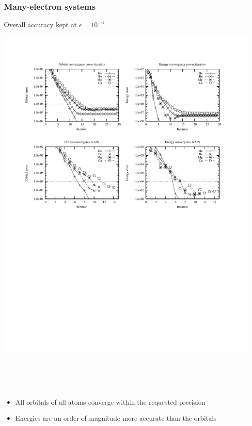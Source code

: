 \documentclass[mathserif, 8pt]{beamer}
\begin{document}
\begin{frame}
    \frametitle{Many-electron systems}
    \centering
    Overall accuracy kept at $\epsilon = 10^{-6}$
    \begin{center}
	\includegraphics[scale=0.6, clip, viewport = 50 550 550 740]{figures/accuracy.pdf}
    \end{center}
    \ \\
    \ \\
    \ \\
    \begin{itemize}
        \item All orbitals of all atoms converge within the requested precision
        \item Energies are an order of magnitude more accurate than the orbitals
    \end{itemize}
\end{frame}
\end{document}
